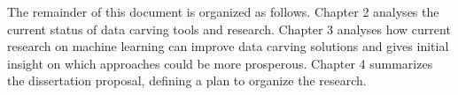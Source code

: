 
The remainder of this document is organized as follows.
    Chapter 2 analyses the current status of data carving tools and research. 
    Chapter 3 analyses how current research on machine learning can improve data carving solutions and gives initial insight on which approaches could be more prosperous.
    Chapter 4 summarizes the dissertation proposal, defining a plan to organize the research.

